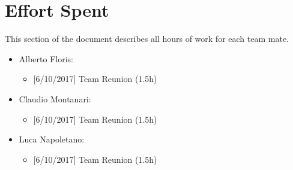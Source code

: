 \chapter{Effort Spent}

This section of the document describes all hours of work for each team mate.

\begin{itemize}

  \item Alberto Floris:
  
      \begin{itemize}
      \item {[}6/10/2017{]} Team Reunion (1.5h)
      \end{itemize}
      
   \item Claudio Montanari:
      \begin{itemize}
      \item {[}6/10/2017{]} Team Reunion (1.5h)
      \end{itemize}
      
   \item Luca Napoletano:
      \begin{itemize}
      \item {[}6/10/2017{]} Team Reunion (1.5h)
      \end{itemize}
      
      
\end{itemize}


